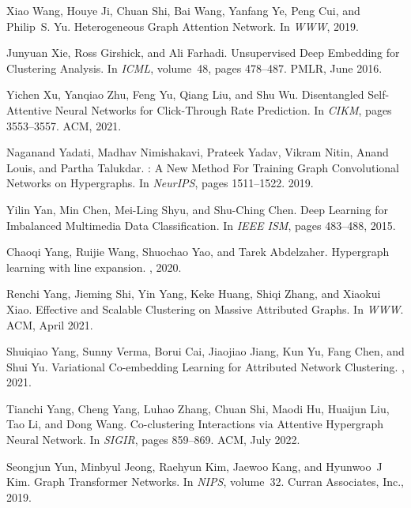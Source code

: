 \documentclass[11pt]{article}
\begin{document}
\begin{thebibliography}{10}
Xiao Wang, Houye Ji, Chuan Shi, Bai Wang, Yanfang Ye, Peng Cui, and Philip~S.
  Yu.
\newblock Heterogeneous {Graph} {Attention} {Network}.
\newblock In {\em WWW}, 2019.

Junyuan Xie, Ross Girshick, and Ali Farhadi.
\newblock Unsupervised {Deep} {Embedding} for {Clustering} {Analysis}.
\newblock In {\em ICML}, volume~48, pages 478--487. PMLR, June 2016.

Yichen Xu, Yanqiao Zhu, Feng Yu, Qiang Liu, and Shu Wu.
\newblock Disentangled {Self}-{Attentive} {Neural} {Networks} for
  {Click}-{Through} {Rate} {Prediction}.
\newblock In {\em CIKM}, pages 3553--3557. ACM, 2021.

Naganand Yadati, Madhav Nimishakavi, Prateek Yadav, Vikram Nitin, Anand Louis,
  and Partha Talukdar.
: {A} {New} {Method} {For} {Training} {Graph}
  {Convolutional} {Networks} on {Hypergraphs}.
\newblock In {\em NeurIPS}, pages 1511--1522. 2019.

Yilin Yan, Min Chen, Mei-Ling Shyu, and Shu-Ching Chen.
\newblock Deep {Learning} for {Imbalanced} {Multimedia} {Data}
  {Classification}.
\newblock In {\em {IEEE} {ISM}}, pages 483--488, 2015.

Chaoqi Yang, Ruijie Wang, Shuochao Yao, and Tarek Abdelzaher.
\newblock Hypergraph learning with line expansion.
, 2020.

Renchi Yang, Jieming Shi, Yin Yang, Keke Huang, Shiqi Zhang, and Xiaokui Xiao.
\newblock Effective and {Scalable} {Clustering} on {Massive} {Attributed}
  {Graphs}.
\newblock In {\em WWW}. ACM, April 2021.

Shuiqiao Yang, Sunny Verma, Borui Cai, Jiaojiao Jiang, Kun Yu, Fang Chen, and
  Shui Yu.
\newblock Variational {Co}-embedding {Learning} for {Attributed} {Network}
  {Clustering}.
, 2021.

Tianchi Yang, Cheng Yang, Luhao Zhang, Chuan Shi, Maodi Hu, Huaijun Liu, Tao
  Li, and Dong Wang.
\newblock Co-clustering {Interactions} via {Attentive} {Hypergraph} {Neural}
  {Network}.
\newblock In {\em SIGIR}, pages 859--869. ACM, July 2022.

Seongjun Yun, Minbyul Jeong, Raehyun Kim, Jaewoo Kang, and Hyunwoo~J Kim.
\newblock Graph {Transformer} {Networks}.
\newblock In {\em NIPS}, volume~32. Curran Associates, Inc., 2019.


\end{thebibliography}
\end{document}
